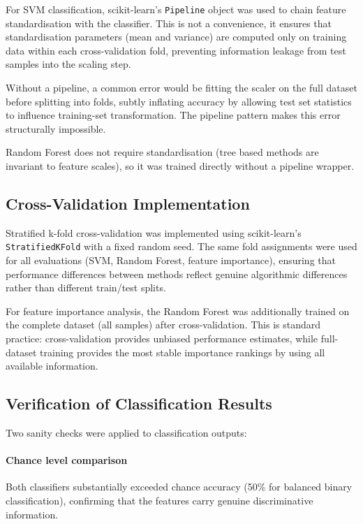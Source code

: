 For SVM classification, scikit-learn's \texttt{Pipeline} object was used to chain feature standardisation with the classifier. This is not a convenience, it ensures that standardisation parameters (mean and variance) are computed only on training data within each cross-validation fold, preventing information leakage from test samples into the scaling step.

Without a pipeline, a common error would be fitting the scaler on the full dataset before splitting into folds, subtly inflating accuracy by allowing test set statistics to influence training-set transformation. The pipeline pattern makes this error structurally impossible.

Random Forest does not require standardisation (tree based methods are invariant to feature scales), so it was trained directly without a pipeline wrapper.

\subsection{Cross-Validation Implementation}

Stratified k-fold cross-validation was implemented using scikit-learn's \texttt{StratifiedKFold} with a fixed random seed. The same fold assignments were used for all evaluations (SVM, Random Forest, feature importance), ensuring that performance differences between methods reflect genuine algorithmic differences rather than different train/test splits.

For feature importance analysis, the Random Forest was additionally trained on the complete dataset (all samples) after cross-validation. This is standard practice: cross-validation provides unbiased performance estimates, while full-dataset training provides the most stable importance rankings by using all available information.

\subsection{Verification of Classification Results}

Two sanity checks were applied to classification outputs:

\paragraph{Chance level comparison} Both classifiers substantially exceeded chance accuracy (50\% for balanced binary classification), confirming that the features carry genuine discriminative information.

